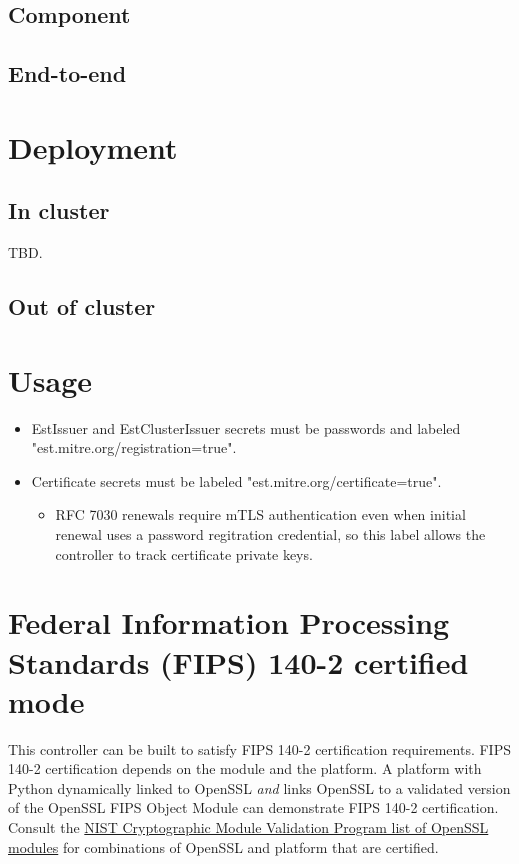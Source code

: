 \documentclass[11pt]{article}
\begin{document}
\subsection{Component}
\label{sec:orgd7222ec}
\subsection{End-to-end}
\label{sec:orgd39ca9f}
\section{Deployment}
\label{sec:orgfbb80ee}
\subsection{In cluster}
\label{sec:org57b8ff8}
TBD.
\subsection{Out of cluster}
\label{sec:orgadf18ec}
\section{Usage}
\label{sec:orgb76633e}
\begin{itemize}
\item EstIssuer and EstClusterIssuer secrets must be passwords and labeled "est.mitre.org/registration=true".
\item Certificate secrets must be labeled "est.mitre.org/certificate=true".
\begin{itemize}
\item RFC 7030 renewals require mTLS authentication even when initial renewal uses a password regitration credential, so this label allows the controller to track certificate private keys.
\end{itemize}
\end{itemize}

\section{Federal Information Processing Standards (FIPS) 140-2 certified mode}
\label{sec:org99c2302}
This controller can be built to satisfy FIPS 140-2 certification requirements.  FIPS 140-2 certification depends on the module and the platform.  A platform with Python dynamically linked to OpenSSL \emph{and} links OpenSSL to a validated version of the OpenSSL FIPS Object Module can demonstrate FIPS 140-2 certification.  Consult the \href{https://csrc.nist.gov/projects/cryptographic-module-validation-program/validated-modules/search?SearchMode=Basic\&ModuleName=OpenSSL\&CertificateStatus=Active\&ValidationYear=0}{NIST Cryptographic Module Validation Program list of OpenSSL modules} for combinations of OpenSSL and platform that are certified.
\end{document}
